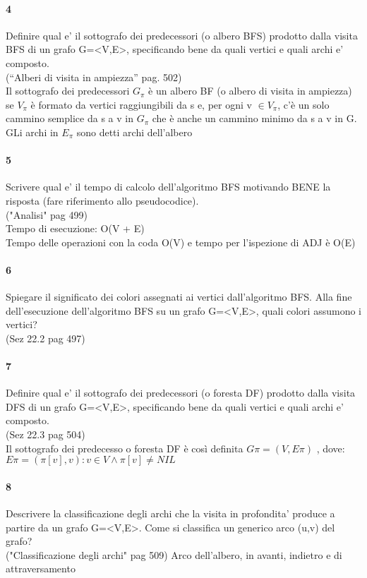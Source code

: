 \documentclass[12pt, a4paper, openany]{book}
\begin{document}
\paragraph{4}
Definire qual e’ il sottografo dei predecessori (o albero BFS) prodotto dalla
visita BFS di un grafo G=<V,E>, specificando bene da quali vertici e quali
archi e’ composto.\\
(“Alberi di visita in ampiezza”  pag. 502)\\
Il sottografo dei predecessori $G_\pi$ è un albero BF (o albero di visita in ampiezza) se $V_\pi$ è formato da vertici raggiungibili da s e, per ogni v $\in V_\pi$, c'è un solo cammino semplice da s a v in $G_\pi$ che è anche un cammino minimo da s a v in G. GLi archi in $E_\pi$ sono detti archi dell'albero
\paragraph{5}
Scrivere qual e’ il tempo di calcolo dell’algoritmo BFS motivando BENE la
risposta (fare riferimento allo pseudocodice).\\
("Analisi" pag 499)\\
Tempo di esecuzione: O(V + E)\\
Tempo delle operazioni con la coda O(V) e tempo per l'ispezione di ADJ è O(E)
\paragraph{6}
Spiegare il significato dei colori assegnati ai vertici dall’algoritmo BFS. Alla
fine dell’esecuzione dell’algoritmo BFS su un grafo G=<V,E>, quali colori
assumono i vertici?\\
(Sez 22.2 pag 497)

\paragraph{7}
Definire qual e’ il sottografo dei predecessori (o foresta DF) prodotto dalla
visita DFS di un grafo G=<V,E>, specificando bene da quali vertici e quali
archi e’ composto.\\
(Sez 22.3 pag 504)\\
Il sottografo dei predecesso o foresta DF è così definita $G\pi = (V, E\pi )$ , dove:
$E\pi = {(\pi[v], v) : v \in V \land \pi[v] \neq NIL}$
\paragraph{8}
Descrivere la classificazione degli archi che la visita in profondita’ produce a
partire da un grafo G=<V,E>. Come si classifica un generico arco (u,v) del
grafo?\\
("Classificazione degli archi" pag 509)
Arco dell'albero, in avanti, indietro e di attraversamento
\end{document}
